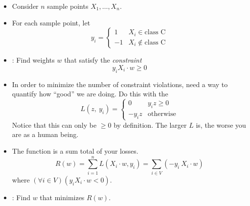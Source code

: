 \documentclass[12pt]{article}
\begin{document}
\subsubsection{}
\begin{itemize}
	\item Consider $n$ sample points $X_1, \ldots, X_n$.
	\item For each sample point, let \[  y_i = \begin{cases}
	1 	& X_i \in \text{class C} \\
	-1 	& X_i \notin \text{class C}
	\end{cases} \]
	\item {}: Find weights $w$ that satisfy the \emph{constraint}
	\begin{equation}
	y_i X_i \cdot w \ge 0
	\end{equation}
	\item In order to minimize the number of constraint violations, need a way to quantify how ``good'' we are doing. Do this with the  \begin{equation}
	L(z,~y_i) =
	\begin{cases}
	0 & y_i z \ge 0 \\
	-y_i z & \text{otherwise}
	\end{cases}
	\end{equation}
	Notice that this can only be $\ge 0$ by definition. The larger $L$ is, the worse you are as a human being.
	\item The  function is a sum total of your losses.
	\begin{equation}
	R(w) = \sum_{i=1}^{n} L(X_i \cdot w, y_i) = \sum_{i \in V} ( -y_i ~ X_i \cdot w)
	\end{equation}
	where $(\forall i \in V)(y_i X_i \cdot w < 0)$.
	\item {}: Find $w$ that minimizes $R(w)$.
\end{itemize}
\end{document}
